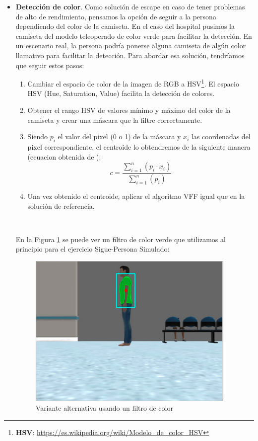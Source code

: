 \begin{itemize}
	\item \textbf{Detección de color}. Como solución de escape en caso de tener problemas de alto de rendimiento, pensamos la opción de seguir a la persona dependiendo del color de la camiseta. En el caso del hospital pusimos la camiseta del modelo teleoperado de color verde para facilitar la detección. En un escenario real, la persona podría ponerse alguna camiseta de algún color llamativo para facilitar la detección. Para abordar esa solución, tendríamos que seguir estos pasos:
	\begin{enumerate}
		\item Cambiar el espacio de color de la imagen de RGB a HSV\footnote{\textbf{HSV}: \url{https://es.wikipedia.org/wiki/Modelo_de_color_HSV}}. El espacio HSV (Hue, Saturation, Value) facilita la detección de colores.
		\item Obtener el rango HSV de valores mínimo y máximo del color de la camiseta y crear una máscara que la filtre correctamente.
		\item Siendo $p_{i}$ el valor del pixel (0 o 1) de la máscara y $x_i$ las coordenadas del pixel correspondiente, el centroide lo obtendremos de la siguiente manera (ecuacion obtenida de \cite{centroide_ecuacion}):
		\begin{equation*}
		c = \frac{\sum_{i=1}^n\left(p_i \cdot x_i\right)}{\sum_{i=1}^n\left(p_i\right)}
		\end{equation*}
		\item Una vez obtenido el centroide, aplicar el algoritmo VFF igual que en la solución de referencia.
	\end{enumerate}\
	
	En la Figura \ref{fig:color_deteccion} se puede ver un filtro de color verde que utilizamos al principio para el ejercicio Sigue-Persona Simulado:\\
	
\begin{figure} [H]
	\begin{center}
	\includegraphics[width=10cm]{imagenes/cap6/deteccion-color.png}
	\end{center}
	\caption[Variante alternativa usando un filtro de color]{Variante alternativa usando un filtro de color}
	\label{fig:color_deteccion}
\end{figure}
	

\end{itemize}
